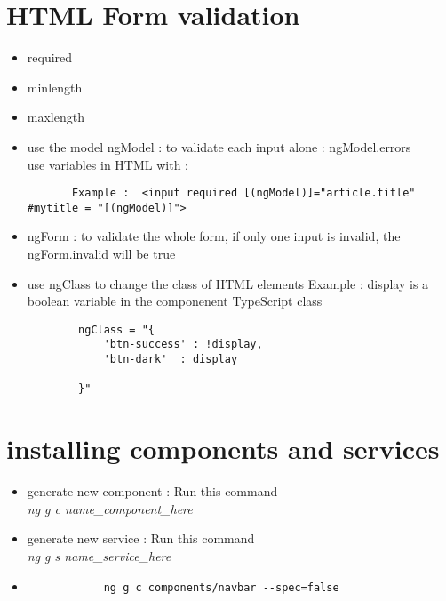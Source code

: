 \documentclass{article}
\begin{document}
\section{HTML Form validation}
\begin{itemize}
    \item required
    \item minlength
    \item maxlength
    \item use the model ngModel : to validate each input alone : ngModel.errors
    \\ use variables in HTML with : 
   
    \begin{lstlisting}
       Example :  <input required [(ngModel)]="article.title"  #mytitle = "[(ngModel)]">
        \end{lstlisting}
    \item ngForm : to validate the whole form, if only one input is invalid, the ngForm.invalid will be true
    \item use ngClass to change the class of HTML elements
        Example : 
        display is a boolean variable in the componenent TypeScript class
        \begin{lstlisting}
        ngClass = "{
            'btn-success' : !display,
            'btn-dark'  : display
        
        }"
        \end{lstlisting}
        
        
\end{itemize}

\section{installing components and services}
\begin{itemize}
    \item generate new component : Run this command \\ \textit{ng g c name\_component\_here}
    \item generate new service : Run this command \\ \textit{ng g s name\_service\_here}
    \item 
    \begin{verbatim}
            ng g c components/navbar --spec=false

    \end{verbatim}

\end{itemize}
\end{document}
